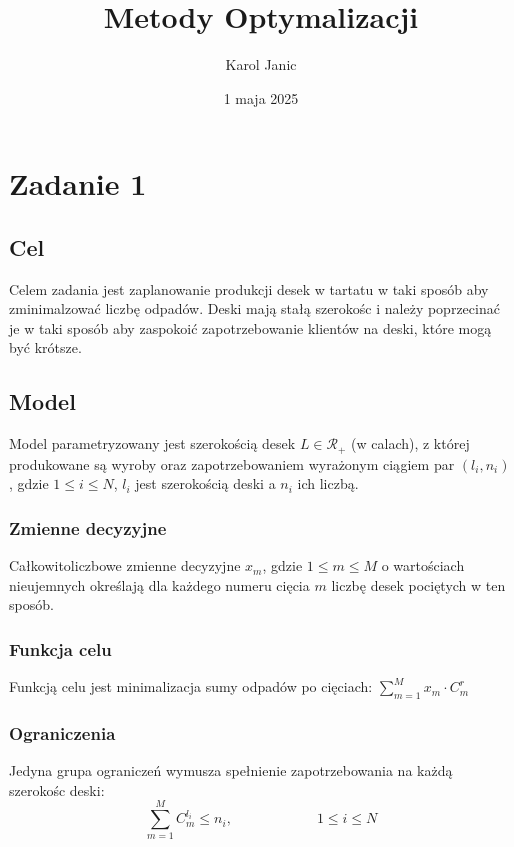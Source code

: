 \documentclass{article}
\title{Metody Optymalizacji}
\author{Karol Janic}
\date{1 maja 2025}
\begin{document}
\begin{titlingpage}
    \maketitle
\end{titlingpage}

\tableofcontents

\newpage

\section{Zadanie 1}
\subsection{Cel}
Celem zadania jest zaplanowanie produkcji desek w tartatu w taki sposób aby zminimalzować liczbę odpadów.
Deski mają stałą szerokośc i należy poprzecinać je w taki sposób aby zaspokoić zapotrzebowanie klientów na deski, które mogą być krótsze.

\subsection{Model}
Model parametryzowany jest szerokością desek $L \in \mathcal{R}_+$ (w calach), z której produkowane są wyroby oraz zapotrzebowaniem wyrażonym ciągiem par $(l_i, n_i)$, gdzie $1 \leq i \leq N$, $l_i$ jest szerokością deski a $n_i$ ich liczbą.

\subsubsection{Zmienne decyzyjne}
Całkowitoliczbowe zmienne decyzyjne $x_m$, gdzie $1 \leq m \leq M$ o wartościach nieujemnych określają dla każdego numeru cięcia $m$ liczbę desek pociętych w ten sposób.

\subsubsection{Funkcja celu}
Funkcją celu jest minimalizacja sumy odpadów po cięciach: $\displaystyle \sum_{m=1}^{M} x_m \cdot C_m^r$

\subsubsection{Ograniczenia}
Jedyna grupa ograniczeń wymusza spełnienie zapotrzebowania na każdą szerokośc deski:
\begin{equation*}
    \sum_{m=1}^M C_m^{l_i} \leq n_i, \qquad \qquad \qquad 1 \leq i \leq N
\end{equation*}
\end{document}
